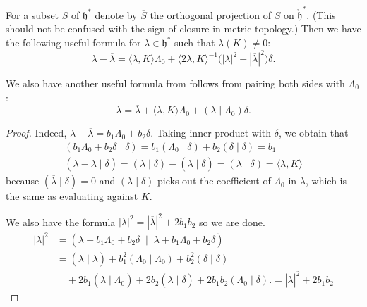 \documentclass[12pt]{article}
\begin{document}
\begin{lemma}\label{lem:affine-formulas}
    For a subset $S$ of $\mathfrak{h}^*$ denote by $\overline{S}$ the orthogonal projection of $S$ on $\mathring{\mathfrak{h}}^*$.
    (This should not be confused with the sign of closure in metric topology.)
    Then we have the following useful formula for $\lambda \in \mathfrak{h}^*$ such that $\lambda(K)\neq 0$:
    \begin{equation}
        \lambda - \overline{\lambda}
        = \langle \lambda, K \rangle \Lambda_0
        + \langle 2\lambda, K \rangle^{-1}\big(|\lambda|^2 - |\overline{\lambda}|^2\big)\delta.
        \tag{6.2.6}
    \end{equation}

    We also have another useful formula from follows from pairing both sides with $\Lambda_0$:
    \begin{equation}
        \lambda = \overline{\lambda} + \langle \lambda, K \rangle \Lambda_0 + (\lambda \mid \Lambda_0)\delta.
    \end{equation}
\end{lemma}

\begin{proof}
    Indeed, $\lambda - \overline{\lambda} = b_1 \Lambda_0 + b_2\delta$.
    Taking inner product with $\delta$, we obtain that \begin{align*}
        (b_1 \Lambda_0 + b_2 \delta \mid \delta) = b_1 (\Lambda_0 \mid \delta) + b_2 (\delta \mid \delta) = b_1 \\
        (\lambda - \overline{\lambda} \mid \delta) = (\lambda \mid \delta) - (\overline{\lambda} \mid \delta) = (\lambda \mid \delta) = \langle \lambda, K \rangle
    \end{align*} because $(\overline{\lambda} \mid \delta) = 0$ and $(\lambda \mid \delta)$ picks out the coefficient of $\Lambda_0$ in $\lambda$, which is the same as evaluating against $K$.

    We also have the formula $|\lambda|^2 = |\overline{\lambda}|^2 + 2b_1 b_2$ so we are done.
    \begin{align*}
        |\lambda|^2
         & = (\overline{\lambda} + b_1 \Lambda_0 + b_2 \delta \;\mid\; \overline{\lambda} + b_1 \Lambda_0 + b_2 \delta) \\[6pt]
         & = (\overline{\lambda}\mid \overline{\lambda})
        + b_1^2 (\Lambda_0 \mid \Lambda_0)
        + b_2^2 (\delta \mid \delta)                                                                                    \\[4pt]
         & \quad + 2b_1 (\overline{\lambda}\mid \Lambda_0)
        + 2b_2 (\overline{\lambda}\mid \delta)
        + 2b_1 b_2 (\Lambda_0\mid \delta).
        = |\overline{\lambda}|^2 + 2b_1 b_2
    \end{align*}
\end{proof}
\end{document}
